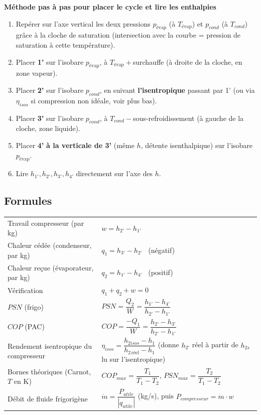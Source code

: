 \begin{methode}
\textbf{Méthode pas à pas pour placer le cycle et lire les enthalpies}
\begin{enumerate}[leftmargin=1.6em]
\item Repérer sur l'axe vertical les deux pressions $p_{\text{évap}}$ (à $T_{\text{évap}}$) et $p_{cond}$ (à $T_{cond}$)
grâce à la cloche de saturation (intersection avec la courbe = pression de saturation à cette température).
\item Placer \textbf{1'} sur l'isobare $p_{\text{évap}}$, à $T_{\text{évap}}+$surchauffe (à droite de la cloche, en zone
vapeur).
\item Placer \textbf{2'} sur l'isobare $p_{cond}$, en suivant \textbf{l'isentropique} passant par 1'
(ou via $\eta_{isos}$ si compression non idéale, voir plus bas).
\item Placer \textbf{3'} sur l'isobare $p_{cond}$, à $T_{cond}-$sous-refroidissement (à gauche de la cloche,
zone liquide).
\item Placer \textbf{4'} \textbf{à la verticale de 3'} (même $h$, détente isenthalpique) sur l'isobare
$p_{\text{évap}}$.
\item Lire $h_{1'},h_{2'},h_{3'},h_{4'}$ directement sur l'axe des $h$.
\end{enumerate}
\end{methode}

\subsection{Formules}

\begin{center}
\renewcommand{\arraystretch}{1.7}
\begin{tabularx}{\linewidth}{@{}l X@{}}
\toprule
Travail compresseur (par kg) & $w=h_{2'}-h_{1'}$ \\
Chaleur cédée (condenseur, par kg) & $q_1=h_{3'}-h_{2'}$ \ (négatif) \\
Chaleur reçue (évaporateur, par kg) & $q_2=h_{1'}-h_{4'}$ \ (positif) \\
Vérification & $q_1+q_2+w=0$ \\
$PSN$ (frigo) & $PSN=\dfrac{Q_2}{W}=\dfrac{h_{1'}-h_{4'}}{h_{2'}-h_{1'}}$ \\
$COP$ (PAC) & $COP=\dfrac{-Q_1}{W}=\dfrac{h_{2'}-h_{3'}}{h_{2'}-h_{1'}}$ \\
Rendement isentropique du compresseur & $\eta_{isos}=\dfrac{h_{2isos}-h_1}{h_{2\,\text{réel}}-h_1}$ (donne
$h_{2'}$ réel à partir de $h_{2s}$ lu sur l'isentropique) \\
Bornes théoriques (Carnot, $T$ en K) & $COP_{max}=\dfrac{T_1}{T_1-T_2}$, \quad
$PSN_{max}=\dfrac{T_2}{T_1-T_2}$ \\
Débit de fluide frigorigène & $\dot m=\dfrac{P_{utile}}{|q_{utile}|}$ (kg/s), puis $P_{compresseur}=\dot m\cdot w$ \\
\bottomrule
\end{tabularx}
\end{center}

